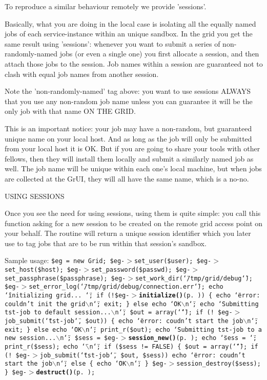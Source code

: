 To reproduce a similar behaviour remotely we provide 'sessions'.

Basically, what you are doing in the local case is isolating all the equally named jobs of each service-instance within an unique sandbox. In the grid you get the same result using 'sessions': whenever you want to submit a series of non-randomly-named jobs (or even a single one) you first allocate a session, and then attach those jobs to the session. Job names within a session are guaranteed not to clash with equal job names from another session.

Note the 'non-randomly-named' tag above: you want to use sessions ALWAYS that you use any non-random job name unless you can guarantee it will be the only job with that name ON THE GRID.

This is an important notice: your job may have a non-random, but guaranteed unique name on your local host. And as long as the job will only be submitted from your local host it is OK. But if you are going to share your tools with other fellows, then they will install them locally and submit a similarly named job as well. The job name will be unique within each one's local machine, but when jobs are collected at the Gr\-UI, they will all have the same name, which is a no-no.

USING SESSIONS

Once you see the need for using sessions, using them is quite simple: you call this function asking for a new session to be created on the remote grid access point on your behalf. The routine will return a unique session identifier which you later use to tag jobs that are to be run within that session's sandbox.

Sample usage: {\tt  \$eg = new Grid; \$eg-$>$set\_\-user(\$user); \$eg-$>$set\_\-host(\$host); \$eg-$>$set\_\-password(\$passwd); \$eg-$>$set\_\-passphrase(\$passphrase); \$eg-$>$set\_\-work\_\-dir(\char`\"{}/tmp/grid/debug\char`\"{}); \$eg-$>$set\_\-error\_\-log(\char`\"{}/tmp/grid/debug/connection.err\char`\"{}); echo \char`\"{}initializing grid... \char`\"{}; if (!\$eg-$>${\bf initialize()}{\rm (p.\,\pageref{classGrid_a11})}) \{ echo \char`\"{}error: couldn't init the grid$\backslash$n\char`\"{}; exit; \} else echo \char`\"{}OK$\backslash$n\char`\"{}; echo \char`\"{}Submitting tst-job to default session...$\backslash$n\char`\"{}; \$out = array(\char`\"{}\char`\"{}); if (! \$eg-$>$job\_\-submit(\char`\"{}tst-job\char`\"{}, \$out)) \{ echo \char`\"{}error: coudn't start the job$\backslash$n\char`\"{}; exit; \} else echo \char`\"{}OK$\backslash$n\char`\"{}; print\_\-r(\$out); echo \char`\"{}Submitting tst-job to a new session...$\backslash$n\char`\"{}; \$sess = \$eg-$>${\bf session\_\-new()}{\rm (p.\,\pageref{classGrid_a13})}; echo \char`\"{}sess = \char`\"{}; print\_\-r(\$sess); echo \char`\"{}$\backslash$n\char`\"{}; if (\$sess != FALSE) \{ \$out = array(\char`\"{}\char`\"{}); if (! \$eg-$>$job\_\-submit(\char`\"{}tst-job\char`\"{}, \$out, \$sess)) echo \char`\"{}error: coudn't start the job$\backslash$n\char`\"{}; else \{ echo \char`\"{}OK$\backslash$n\char`\"{}; \} \$eg-$>$session\_\-destroy(\$sess); \} \$eg-$>${\bf destruct()}{\rm (p.\,\pageref{classGrid_a1})}; }

